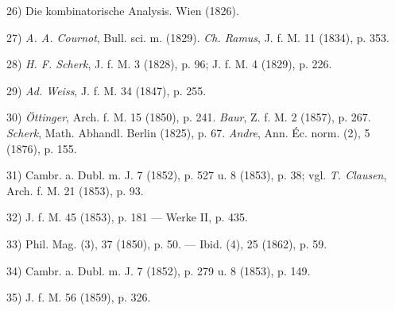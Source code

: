\vspace{-0.1cm}
\leftline{\rule{2in}{0.4pt}}
\vspace{0.1cm}
{
\footnotesize
26) Die kombinatorische Analysis. Wien (1826).

27) \textit{A. A. Cournot}, Bull. sci. m. (1829). \textit{Ch. Ramus}, J. f. M. 11 (1834), p. 353.

28) \textit{H. F. Scherk}, J. f. M. 3 (1828), p. 96; J. f. M. 4 (1829), p. 226.

29) \textit{Ad. Weiss}, J. f. M. 34 (1847), p. 255.

30) \textit{Öttinger}, Arch. f. M. 15 (1850), p. 241. \textit{Baur}, Z. f. M. 2 (1857), p. 267. \textit{Scherk}, Math. Abhandl. Berlin (1825), p. 67. \textit{Andre}, Ann. Éc. norm. (2), 5 (1876), p. 155.

31) Cambr. a. Dubl. m. J. 7 (1852), p. 527 u. 8 (1853), p. 38; vgl. \textit{T. Clausen}, Arch. f. M. 21 (1853), p. 93.

32) J. f. M. 45 (1853), p. 181 — Werke II, p. 435.

33) Phil. Mag. (3), 37 (1850), p. 50. — Ibid. (4), 25 (1862), p. 59.

34) Cambr. a. Dubl. m. J. 7 (1852), p. 279 u. 8 (1853), p. 149.

35) J. f. M. 56 (1859), p. 326.

}
